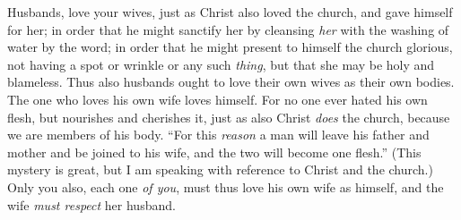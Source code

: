 \begin{biblechapter}
 Husbands, love your wives, just as Christ also loved the church, and gave himself for her;
\verse in order that he might sanctify her by cleansing \textit{her} with the washing of water by the word;
\verse in order that he might present to himself the church glorious, not having a spot or wrinkle or any such \textit{thing}, but that she may be holy and blameless.
\verse Thus also husbands ought to love their own wives as their own bodies. The one who loves his own wife loves himself.
\verse For no one ever hated his own flesh, but nourishes and cherishes it, just as also Christ \textit{does} the church,
\verse because we are members of his body.
\verse “For this \textit{reason} a man will leave his father and mother and be joined to his wife, and the two will become one flesh.”
\verse (This mystery is great, but I am speaking with reference to Christ and the church.)
\verse Only you also, each one \textit{of you}, must thus love his own wife as himself, and the wife \textit{must respect} her husband.
\end{biblechapter}

